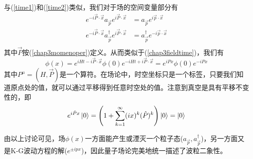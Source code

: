 与(\ref{time1})和(\ref{time2})类似，我们对于场的空间变量部分有
\begin{equation}
\begin{aligned}
    e^{-i\vec{P}\cdot\vec{x}}a_{\vec{p}} e^{i\vec{P}\cdot\vec{x}}&=a_{\vec{p}} e^{i\vec{p}\cdot\vec{x}}\\
     e^{-i\vec{P}\cdot\vec{x}}a^{\dagger}_{\vec{p}} e^{i\vec{P}\cdot\vec{x}}&=a^{\dagger}_{\vec{p}} e^{-i\vec{p}\cdot\vec{x}}\\
    \end{aligned}
\end{equation}
其中$\vec{P}$按(\ref{chap3momenoper})定义。从而类似于(\ref{chap3fieldtime})，我们有
\begin{equation}
\label{chap3trans}
    \phi(x)=e^{iHt-i\vec{P}\cdot\vec{x}}\phi(0)e^{-iHt+i\vec{P}\cdot\vec{x}}=e^{iPx}\phi(0)e^{-iPx}
\end{equation}
其中$P^{\mu}=(H,\vec{P})$是一个算符。在场论中，时空坐标只是一个标签，只要我们知道原点处的值，就可以通过平移得到任意时空处的值。注意到真空是具有平移不变性的，即
\begin{equation}
    e^{i\hat{P}x}\ket{0}=\left(1+\sum\limits_{k=1}\limits^{\infty}(ix)^{k}(\hat{P})^{k}\right)\ket{0}=\ket{0}
\end{equation}

由以上讨论可见，场$\phi(x)$一方面能产生或湮灭一个粒子态($a_{\vec{p}},a^{\dagger}_{\vec{p}}$)，另一方面又是K-G波动方程的解($e^{\pm ipx}$)，因此量子场论完美地统一描述了波粒二象性。
